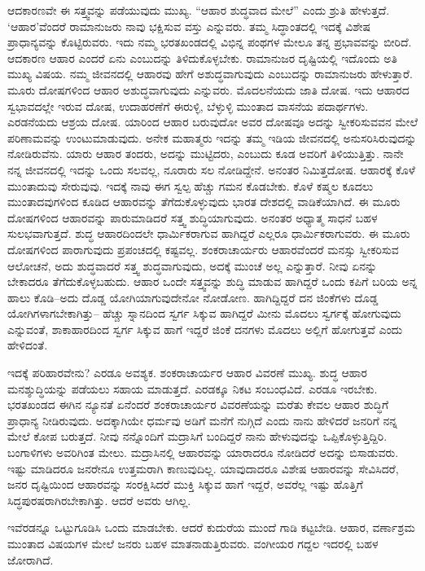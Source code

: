 ಆದಕಾರಣವೇ ಈ ಸತ್ತ್ವವನ್ನು ಪಡೆಯುವುದು ಮುಖ್ಯ. “ಆಹಾರ ಶುದ್ಧವಾದ ಮೇಲೆ” ಎಂದು ಶ್ರುತಿ ಹೇಳುತ್ತದೆ. ‘ಆಹಾರ’ವೆಂದರೆ ರಾಮಾನುಜರು ನಾವು ಭಕ್ಷಿಸುವ ವಸ್ತು ಎನ್ನುವರು. ತಮ್ಮ ಸಿದ್ಧಾಂತದಲ್ಲಿ ಇದಕ್ಕೆ ವಿಶೇಷ ಪ್ರಾಧಾನ್ಯವನ್ನು ಕೊಟ್ಟಿರುವರು. ಇದು ನಮ್ಮ ಭರತಖಂಡದಲ್ಲಿ ವಿಭಿನ್ನ ಪಂಥಗಳ ಮೇಲೂ ತನ್ನ ಪ್ರಭಾವವನ್ನು ಬೀರಿದೆ. ಆದಕಾರಣ ಆಹಾರ ಎಂದರೆ ಏನು ಎಂಬುದನ್ನು ತಿಳಿದುಕೊಳ್ಳಬೇಕು. ರಾಮಾನುಜರ ದೃಷ್ಟಿಯಲ್ಲಿ ಇದೊಂದು ಅತಿ ಮುಖ್ಯ ವಿಷಯ. ನಮ್ಮ ಜೀವನದಲ್ಲಿ ಆಹಾರವು ಹೇಗೆ ಅಶುದ್ಧವಾಗುವುದು ಎಂಬುದನ್ನು ರಾಮಾನುಜರು ಹೇಳುತ್ತಾರೆ. ಮೂರು ದೋಷಗಳಿಂದ ಆಹಾರ ಅಶುದ್ಧವಾಗುವುದು ಎನ್ನುವರು. ಮೊದಲನೆಯದು ಜಾತಿ ದೋಷ. ಇದು ಆಹಾರದ ಸ್ವಭಾವದಲ್ಲೇ ಇರುವ ದೋಷ, ಉದಾಹರಣೆಗೆ ಈರುಳ್ಳಿ, ಬೆಳ್ಳುಳ್ಳಿ ಮುಂತಾದ ವಾಸನೆಯ ಪದಾರ್ಥಗಳು. ಎರಡನೆಯದು ಆಶ್ರಯ ದೋಷ. ಯಾರಿಂದ ಆಹಾರ ಬರುವುದೋ ಅವರ ದೋಷವೂ ಅದನ್ನು ಸ್ವೀಕರಿಸುವವನ ಮೇಲೆ ಪರಿಣಾಮವನ್ನು ಉಂಟುಮಾಡುವುದು. ಅನೇಕ ಮಹಾತ್ಮರು ಇದನ್ನು ತಮ್ಮ ಇಡಿಯ ಜೀವನದಲ್ಲಿ ಅನುಸರಿಸಿರುವುದನ್ನು ನೋಡಿರುವೆನು. ಯಾರು ಆಹಾರ ತಂದರು, ಅದನ್ನು ಮುಟ್ಟಿದರು, ಎಂಬುದು ಕೂಡ ಅವರಿಗೆ ತಿಳಿಯುತ್ತಿತ್ತು. ನಾನೇ ನನ್ನ ಜೀವನದಲ್ಲಿ ಇದನ್ನು ಒಂದು ಸಲವಲ್ಲ, ನೂರಾರು ಸಲ ನೋಡಿದ್ದೇನೆ. ಅನಂತರ ನಿಮಿತ್ತದೋಷ. ಆಹಾರಕ್ಕೆ ಕೊಳೆ ಮುಂತಾದುವು ಸೇರುವುವು. ಇದಕ್ಕೆ ನಾವು ಈಗ ಸ್ವಲ್ಪ ಹೆಚ್ಚು ಗಮನ ಕೊಡಬೇಕು. ಕೊಳೆ ಕಷ್ಮಲ ಕೂದಲು ಮುಂತಾದವುಗಳಿಂದ ಕೂಡಿದ ಆಹಾರವನ್ನು ತೆಗೆದುಕೊಳ್ಳುವುದು ಭಾರತ ದೇಶದಲ್ಲಿ ವಾಡಿಕೆಯಾಗಿದೆ. ಈ ಮೂರು ದೋಷಗಳಿಂದ ಆಹಾರವನ್ನು ಪಾರುಮಾಡಿದರೆ ಸತ್ತ್ವ ಶುದ್ಧಿಯಾಗುವುದು. ಅನಂತರ ಅಧ್ಯಾತ್ಮ ಸಾಧನೆ ಬಹಳ ಸುಲಭವಾಗುತ್ತದೆ. ಶುದ್ಧ ಆಹಾರದಿಂದಲೇ ಧಾರ್ಮಿಕರಾಗುವ ಹಾಗಿದ್ದರೆ ಎಲ್ಲರೂ ಧಾರ್ಮಿಕರಾಗುವರು. ಈ ಮೂರು ದೋಷಗಳಿಂದ ಪಾರಾಗುವುದು ಪ್ರಪಂಚದಲ್ಲಿ ಕಷ್ಟವಲ್ಲ. ಶಂಕರಾಚಾರ್ಯರು ಆಹಾರವೆಂದರೆ ಮನಸ್ಸು ಸ್ವೀಕರಿಸುವ ಆಲೋಚನೆ, ಅದು ಶುದ್ಧವಾದರೆ ಸತ್ತ್ವ ಶುದ್ಧವಾಗುವುದು, ಅದಕ್ಕೆ ಮುಂಚೆ ಅಲ್ಲ ಎನ್ನುತ್ತಾರೆ. ನೀವು ಏನನ್ನು ಬೇಕಾದರೂ ತೆಗೆದುಕೊಳ್ಳಬಹುದು. ಆಹಾರ ಒಂದೇ ಸತ್ತ್ವವನ್ನು ಶುದ್ಧಿ ಮಾಡುವ ಹಾಗಿದ್ದರೆ ಒಂದು ಕಪಿಗೆ ಬರಿಯ ಅನ್ನ ಹಾಲು ಕೊಡಿ–ಅದು ದೊಡ್ಡ ಯೋಗಿಯಾಗುವುದೇನೋ ನೋಡೋಣ. ಹಾಗಿದ್ದಿದ್ದರೆ ದನ ಜಿಂಕೆಗಳು ದೊಡ್ಡ ಯೋಗಿಗಳಾಗಬೇಕಾಗಿತ್ತು– ಹೆಚ್ಚು ಸ್ನಾನದಿಂದ ಸ್ವರ್ಗ ಸಿಕ್ಕುವ ಹಾಗಿದ್ದರೆ ಮೀನು ಮೊದಲು ಸ್ವರ್ಗಕ್ಕೆ ಹೋಗುವುದು ಎನ್ನುವಂತೆ, ಶಾಕಾಹಾರದಿಂದ ಸ್ವರ್ಗ ಸಿಕ್ಕುವ ಹಾಗೆ ಇದ್ದರೆ ಜಿಂಕೆ ದನಗಳು ಮೊದಲು ಅಲ್ಲಿಗೆ ಹೋಗುತ್ತವೆ ಎಂದು ಹೇಳಿದಂತೆ.

ಇದಕ್ಕೆ ಪರಿಹಾರವೇನು? ಎರಡೂ ಅವಶ್ಯಕ. ಶಂಕರಾಚಾರ್ಯರ ಆಹಾರ ವಿವರಣೆ ಮುಖ್ಯ. ಶುದ್ಧ ಆಹಾರ ಮನಶ್ಶುದ್ಧಿಯನ್ನು ಪಡೆಯಲು ಸಹಾಯ ಮಾಡುತ್ತದೆ. ಎರಡಕ್ಕೂ ನಿಕಟ ಸಂಬಂಧವಿದೆ. ಎರಡೂ ಇರಬೇಕು. ಭರತಖಂಡದ ಈಗಿನ ನ್ಯೂನತೆ ಏನೆಂದರೆ ಶಂಕರಾಚಾರ್ಯರ ವಿವರಣೆಯನ್ನು ಮರೆತು ಕೇವಲ ಆಹಾರ ಶುದ್ಧಿಗೆ ಪ್ರಾಧಾನ್ಯ ನೀಡಿರುವುದು. ಅದಕ್ಕಾಗಿಯೇ ಧರ್ಮವು ಅಡಿಗೆ ಮನೆಗೆ ನುಗ್ಗಿದೆ ಎಂದು ನಾನು ಹೇಳಿದರೆ ಜನರಿಗೆ ನನ್ನ ಮೇಲೆ ಕೋಪ ಬರುತ್ತದೆ. ನೀವು ನನ್ನೊಂದಿಗೆ ಮದ್ರಾಸಿಗೆ ಬಂದಿದ್ದರೆ ನಾನು ಹೇಳುವುದನ್ನು ಒಪ್ಪಿಕೊಳ್ಳುತ್ತಿದ್ದಿರಿ. ಬಂಗಾಳಿಗಳು ಅವರಿಗಿಂತ ಮೇಲು. ಮದ್ರಾಸಿನಲ್ಲಿ ಆಹಾರವನ್ನು ಯಾರಾದರೂ ನೋಡಿದರೆ ಅದನ್ನು ಬಿಸಾಡುವರು. ಇಷ್ಟು ಮಾಡಿದರೂ ಜನರೇನೂ ಉತ್ತಮರಾಗಿ ಕಾಣುವುದಿಲ್ಲ. ಯಾವುದಾದರೂ ವಿಶೇಷ ಆಹಾರವನ್ನು ಸೇವಿಸಿದರೆ, ಜನರ ದೃಷ್ಟಿಯಿಂದ ಆಹಾರವನ್ನು ಸಂರಕ್ಷಿಸಿದರೆ ಮುಕ್ತಿ ಸಿಕ್ಕುವ ಹಾಗೆ ಇದ್ದರೆ, ಅವರೆಲ್ಲ ಇಷ್ಟು ಹೊತ್ತಿಗೆ ಸಿದ್ಧಪುರಷರಾಗಿರಬೇಕಾಗಿತ್ತು. ಆದರೆ ಅವರು ಆಗಿಲ್ಲ.

ಇವೆರಡನ್ನೂ ಒಟ್ಟುಗೂಡಿಸಿ ಒಂದು ಮಾಡಬೇಕು. ಆದರೆ ಕುದುರೆಯ ಮುಂದೆ ಗಾಡಿ ಕಟ್ಟಬೇಡಿ. ಆಹಾರ, ವರ್ಣಾಶ್ರಮ ಮುಂತಾದ ವಿಷಯಗಳ ಮೇಲೆ ಜನರು ಬಹಳ ಮಾತನಾಡುತ್ತಿರುವರು. ವಂಗೀಯರ ಗದ್ದಲ ಇದರಲ್ಲಿ ಬಹಳ ಜೋರಾಗಿದೆ.

